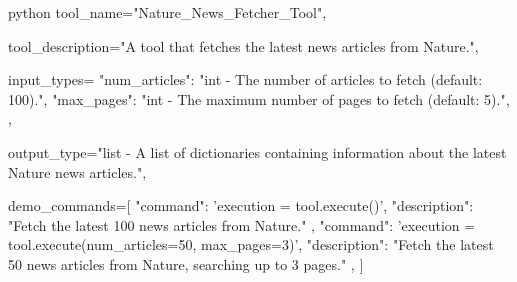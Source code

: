 \begin{codecolorbox}{python}
tool_name="Nature_News_Fetcher_Tool",

tool_description="A tool that fetches the latest news articles from Nature.",

input_types={
    "num_articles": "int - The number of articles to fetch (default: 100).",
    "max_pages": "int - The maximum number of pages to fetch (default: 5).",
},

output_type="list - A list of dictionaries containing information about the latest Nature news articles.",

demo_commands=[
    {
        "command": 'execution = tool.execute()',
        "description": "Fetch the latest 100 news articles from Nature."
    },
    {
        "command": 'execution = tool.execute(num_articles=50, max_pages=3)',
        "description": "Fetch the latest 50 news articles from Nature, searching up to 3 pages."
    },
]
\end{codecolorbox}


